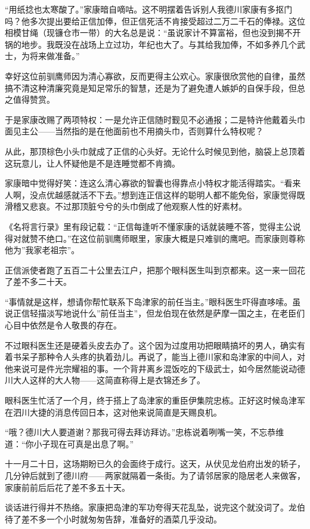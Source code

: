 \documentclass[
]{book}
\begin{document}
``用纸捻也太寒酸了。''家康暗自嘀咕。这不明摆着告诉别人我德川家康有多抠门吗？他多次提出要给正信加俸，但正信死活不肯接受超过二万二千石的俸禄。这位相模甘绳（现镰仓市一带）的大名总是说：``虽说家计不算富裕，但也没到揭不开锅的地步。我既没在战场上立过功，年纪也大了。与其给我加俸，不如多养几个武士，为将来做准备。''

幸好这位前驯鹰师因为清心寡欲，反而更得主公欢心。家康很欣赏他的自律，虽然搞不清这种清廉究竟是知足常乐的智慧，还是为了避免遭人嫉妒的自保手段，但总之值得赞赏。

于是家康改赐了两项特权：一是允许正信随时觐见不必通报；二是特许他戴着头巾面见主公------当然指的是在他面前也不用摘头巾，否则算什么特权呢？

从此，那顶棕色小头巾就成了正信的心头好。无论什么时候见到他，脑袋上总顶着这玩意儿，让人怀疑他是不是连睡觉都不肯摘。

家康暗中觉得好笑：连这么清心寡欲的智囊也得靠点小特权才能活得踏实。``看来人啊，没点优越感就活不下去。''想到连正信这样的聪明人都不能免俗，家康觉得既滑稽又悲哀。不过那顶脏兮兮的头巾倒成了他观察人性的好素材。

《名将言行录》里有段记载：``正信每逢听不懂家康的话就装睡不答，觉得主公说得对就赞不绝口。''在这位前驯鹰师眼里，家康大概是只难驯的鹰吧。而家康则尊称他为''我家老祖宗''。

正信派使者跑了五百二十公里去江户，把那个眼科医生叫到京都来。这一来一回花了差不多二十天。

``事情就是这样，想请你帮忙联系下岛津家的前任当主。''眼科医生吓得直哆嗦。虽说正信轻描淡写地说什么''前任当主''，但龙伯现在依然是萨摩一国之主，在老臣们心目中依然是令人敬畏的存在。

不过眼科医生还是硬着头皮去办了。这个因为过度用功把眼睛搞坏的男人，确实有着书呆子那种令人头疼的执着劲儿。再说了，能当上德川家和岛津家的中间人，对他来说可是件光宗耀祖的事。一个背井离乡混饭吃的下级武士，如今居然能说动德川大人这样的大人物------这简直称得上是衣锦还乡了。

眼科医生忙活了一个月，终于搭上了岛津家的重臣伊集院忠栋。正好这时候岛津军在泗川大捷的消息传回日本，这对他来说简直是天赐良机。

``哦？德川大人要道谢？那我可得去拜访拜访。''忠栋说着咧嘴一笑，不忘恭维道：``你小子现在可真是出息了啊。''

十一月二十日，这场期盼已久的会面终于成行。这天，从伏见龙伯府出发的轿子，几分钟后就到了德川府------两家就隔着一条街。为了请邻居家的隐居老人来做客，家康前前后后花了差不多五十天。

谈话进行得并不热络。家康把岛津的军功夸得天花乱坠，说完这个就没词了。龙伯待了差不多一个小时就匆匆告辞，准备好的酒菜几乎没动。
\end{document}
